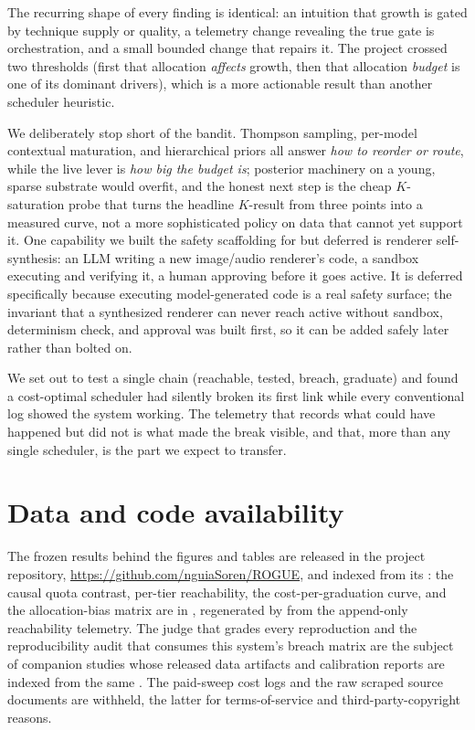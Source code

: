 \documentclass[letterpaper,twocolumn,10pt]{article}
\begin{document}
The recurring shape of every finding is identical: an intuition that growth is gated by technique supply or quality, a telemetry change revealing the true gate is orchestration, and a small bounded change that repairs it. The project crossed two thresholds (first that allocation \emph{affects} growth, then that allocation \emph{budget} is one of its dominant drivers), which is a more actionable result than another scheduler heuristic.

We deliberately stop short of the bandit. Thompson sampling, per-model contextual maturation, and hierarchical priors all answer \emph{how to reorder or route}, while the live lever is \emph{how big the budget is}; posterior machinery on a young, sparse substrate would overfit, and the honest next step is the cheap $K$-saturation probe that turns the headline $K$-result from three points into a measured curve, not a more sophisticated policy on data that cannot yet support it. One capability we built the safety scaffolding for but deferred is renderer self-synthesis: an LLM writing a new image/audio renderer's code, a sandbox executing and verifying it, a human approving before it goes active. It is deferred specifically because executing model-generated code is a real safety surface; the invariant that a synthesized renderer can never reach active without sandbox, determinism check, and approval was built first, so it can be added safely later rather than bolted on.

We set out to test a single chain (reachable, tested, breach, graduate) and found a cost-optimal scheduler had silently broken its first link while every conventional log showed the system working. The telemetry that records what could have happened but did not is what made the break visible, and that, more than any single scheduler, is the part we expect to transfer.

\section*{Data and code availability}

{\raggedright
The frozen results behind the figures and tables are released in the project repository, \url{https://github.com/nguiaSoren/ROGUE}, and indexed from its : the causal quota contrast, per-tier reachability, the cost-per-graduation curve, and the allocation-bias matrix are in , regenerated by  from the append-only  reachability telemetry. The judge that grades every reproduction and the reproducibility audit that consumes this system's breach matrix are the subject of companion studies whose released data artifacts and calibration reports are indexed from the same . The paid-sweep cost logs and the raw scraped source documents are withheld, the latter for terms-of-service and third-party-copyright reasons.
\par}



\end{document}
